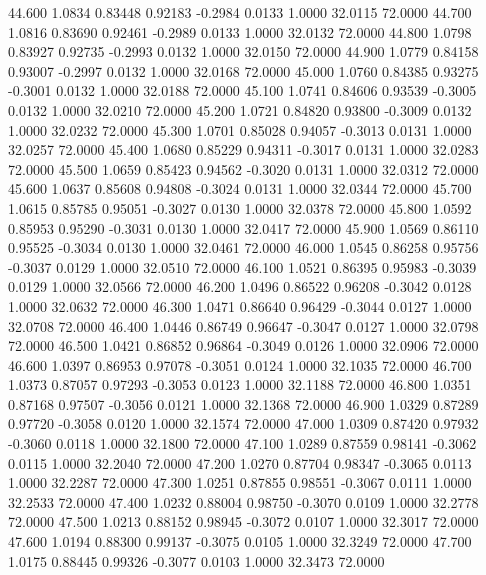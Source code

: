   44.600   1.0834   0.83448   0.92183  -0.2984   0.0133   1.0000  32.0115  72.0000
  44.700   1.0816   0.83690   0.92461  -0.2989   0.0133   1.0000  32.0132  72.0000
  44.800   1.0798   0.83927   0.92735  -0.2993   0.0132   1.0000  32.0150  72.0000
  44.900   1.0779   0.84158   0.93007  -0.2997   0.0132   1.0000  32.0168  72.0000
  45.000   1.0760   0.84385   0.93275  -0.3001   0.0132   1.0000  32.0188  72.0000
  45.100   1.0741   0.84606   0.93539  -0.3005   0.0132   1.0000  32.0210  72.0000
  45.200   1.0721   0.84820   0.93800  -0.3009   0.0132   1.0000  32.0232  72.0000
  45.300   1.0701   0.85028   0.94057  -0.3013   0.0131   1.0000  32.0257  72.0000
  45.400   1.0680   0.85229   0.94311  -0.3017   0.0131   1.0000  32.0283  72.0000
  45.500   1.0659   0.85423   0.94562  -0.3020   0.0131   1.0000  32.0312  72.0000
  45.600   1.0637   0.85608   0.94808  -0.3024   0.0131   1.0000  32.0344  72.0000
  45.700   1.0615   0.85785   0.95051  -0.3027   0.0130   1.0000  32.0378  72.0000
  45.800   1.0592   0.85953   0.95290  -0.3031   0.0130   1.0000  32.0417  72.0000
  45.900   1.0569   0.86110   0.95525  -0.3034   0.0130   1.0000  32.0461  72.0000
  46.000   1.0545   0.86258   0.95756  -0.3037   0.0129   1.0000  32.0510  72.0000
  46.100   1.0521   0.86395   0.95983  -0.3039   0.0129   1.0000  32.0566  72.0000
  46.200   1.0496   0.86522   0.96208  -0.3042   0.0128   1.0000  32.0632  72.0000
  46.300   1.0471   0.86640   0.96429  -0.3044   0.0127   1.0000  32.0708  72.0000
  46.400   1.0446   0.86749   0.96647  -0.3047   0.0127   1.0000  32.0798  72.0000
  46.500   1.0421   0.86852   0.96864  -0.3049   0.0126   1.0000  32.0906  72.0000
  46.600   1.0397   0.86953   0.97078  -0.3051   0.0124   1.0000  32.1035  72.0000
  46.700   1.0373   0.87057   0.97293  -0.3053   0.0123   1.0000  32.1188  72.0000
  46.800   1.0351   0.87168   0.97507  -0.3056   0.0121   1.0000  32.1368  72.0000
  46.900   1.0329   0.87289   0.97720  -0.3058   0.0120   1.0000  32.1574  72.0000
  47.000   1.0309   0.87420   0.97932  -0.3060   0.0118   1.0000  32.1800  72.0000
  47.100   1.0289   0.87559   0.98141  -0.3062   0.0115   1.0000  32.2040  72.0000
  47.200   1.0270   0.87704   0.98347  -0.3065   0.0113   1.0000  32.2287  72.0000
  47.300   1.0251   0.87855   0.98551  -0.3067   0.0111   1.0000  32.2533  72.0000
  47.400   1.0232   0.88004   0.98750  -0.3070   0.0109   1.0000  32.2778  72.0000
  47.500   1.0213   0.88152   0.98945  -0.3072   0.0107   1.0000  32.3017  72.0000
  47.600   1.0194   0.88300   0.99137  -0.3075   0.0105   1.0000  32.3249  72.0000
  47.700   1.0175   0.88445   0.99326  -0.3077   0.0103   1.0000  32.3473  72.0000

